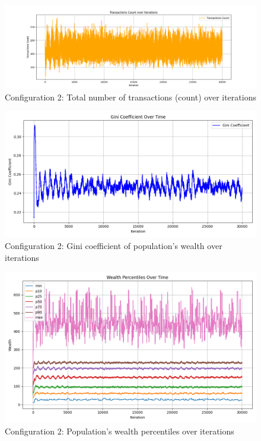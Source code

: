 \documentclass[english]{projectreport}
\begin{document}
    \begin{figure}[H]
        \centering
        \includegraphics[width=0.8\linewidth]{metrics_config2/metrics_config2_total_transactions_count.png}
        \caption{Configuration 2: Total number of transactions (count) over iterations}
        \label{fig:c0-total_transactions_count}
    \end{figure}

    \begin{figure}[H]
        \centering
        \includegraphics[width=0.8\linewidth]{metrics_config2/metrics_config2_gini_coefficient.png}
        \caption{Configuration 2: Gini coefficient of population's wealth over iterations}
        \label{fig:c0-gini_coefficient}
    \end{figure}

    \begin{figure}[H]
        \centering
        \includegraphics[width=0.8\linewidth]{metrics_config2/metrics_config2_wealth_perc_time.png}
        \caption{Configuration 2: Population's wealth percentiles over iterations}
        \label{fig:c0-wealth_perc_time}
    \end{figure}
\end{document}
